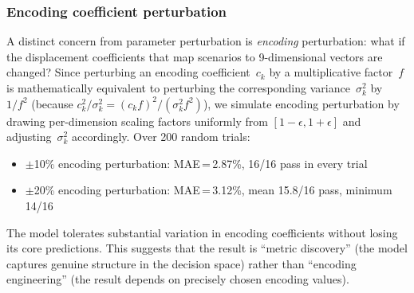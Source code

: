 \documentclass[journal]{IEEEtran}
\begin{document}
\subsubsection{Encoding coefficient perturbation}
A distinct concern from parameter perturbation is \emph{encoding} perturbation: what if the displacement coefficients that map scenarios to 9-dimensional vectors are changed?
Since perturbing an encoding coefficient~$c_k$ by a multiplicative factor~$f$ is mathematically equivalent to perturbing the corresponding variance~$\sigma_k^2$ by~$1/f^2$ (because $c_k^2/\sigma_k^2 = (c_k f)^2 / (\sigma_k^2 f^2)$), we simulate encoding perturbation by drawing per-dimension scaling factors uniformly from $[1-\epsilon, 1+\epsilon]$ and adjusting~$\sigma_k^2$ accordingly.
Over 200 random trials:
\begin{itemize}
    \item $\pm$10\% encoding perturbation: MAE\,=\,2.87\%, 16/16 pass in every trial
    \item $\pm$20\% encoding perturbation: MAE\,=\,3.12\%, mean 15.8/16 pass, minimum 14/16
\end{itemize}
The model tolerates substantial variation in encoding coefficients without losing its core predictions.
This suggests that the result is ``metric discovery'' (the model captures genuine structure in the decision space) rather than ``encoding engineering'' (the result depends on precisely chosen encoding values).
\end{document}
